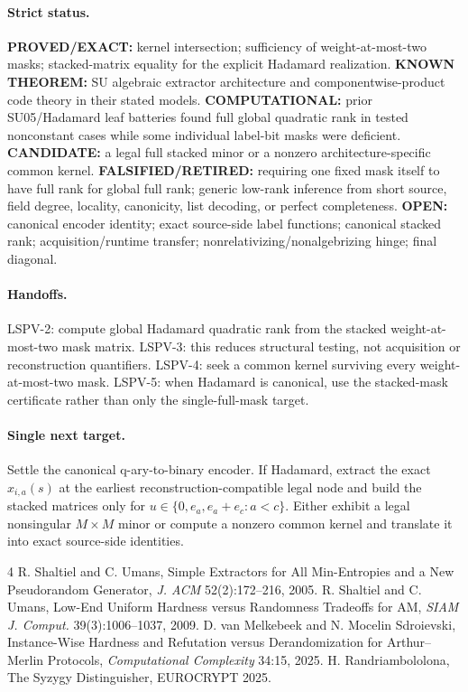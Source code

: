 \documentclass[11pt]{article}
\begin{document}
\paragraph{Strict status.}
\textbf{PROVED/EXACT:} kernel intersection; sufficiency of weight-at-most-two masks; stacked-matrix equality for the explicit Hadamard realization.
\textbf{KNOWN THEOREM:} SU algebraic extractor architecture and componentwise-product code theory in their stated models.
\textbf{COMPUTATIONAL:} prior SU05/Hadamard leaf batteries found full global quadratic rank in tested nonconstant cases while some individual label-bit masks were deficient.
\textbf{CANDIDATE:} a legal full stacked minor or a nonzero architecture-specific common kernel.
\textbf{FALSIFIED/RETIRED:} requiring one fixed mask itself to have full rank for global full rank; generic low-rank inference from short source, field degree, locality, canonicity, list decoding, or perfect completeness.
\textbf{OPEN:} canonical encoder identity; exact source-side label functions; canonical stacked rank; acquisition/runtime transfer; nonrelativizing/nonalgebrizing hinge; final diagonal.

\paragraph{Handoffs.}
LSPV-2: compute global Hadamard quadratic rank from the stacked weight-at-most-two mask matrix. LSPV-3: this reduces structural testing, not acquisition or reconstruction quantifiers. LSPV-4: seek a common kernel surviving every weight-at-most-two mask. LSPV-5: when Hadamard is canonical, use the stacked-mask certificate rather than only the single-full-mask target.

\paragraph{Single next target.}
Settle the canonical q-ary-to-binary encoder. If Hadamard, extract the exact $x_{i,a}(s)$ at the earliest reconstruction-compatible legal node and build the stacked matrices only for $u\in\{0,e_a,e_a+e_c:a<c\}$. Either exhibit a legal nonsingular $M\times M$ minor or compute a nonzero common kernel and translate it into exact source-side identities.

\begin{thebibliography}{4}
 R. Shaltiel and C. Umans, Simple Extractors for All Min-Entropies and a New Pseudorandom Generator, \emph{J. ACM} 52(2):172--216, 2005.
 R. Shaltiel and C. Umans, Low-End Uniform Hardness versus Randomness Tradeoffs for AM, \emph{SIAM J. Comput.} 39(3):1006--1037, 2009.
 D. van Melkebeek and N. Mocelin Sdroievski, Instance-Wise Hardness and Refutation versus Derandomization for Arthur--Merlin Protocols, \emph{Computational Complexity} 34:15, 2025.
 H. Randriambololona, The Syzygy Distinguisher, EUROCRYPT 2025.
\end{thebibliography}
\end{document}
